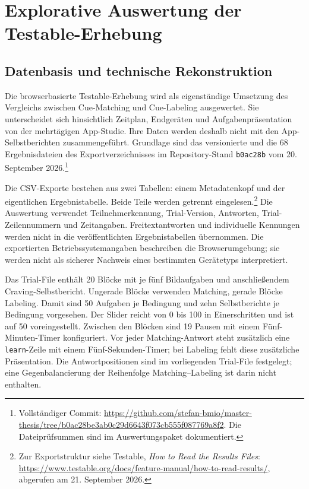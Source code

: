 \section{Explorative Auswertung der Testable-Erhebung}
\label{sec:testable-auswertung}


\subsection{Datenbasis und technische Rekonstruktion}
Die browserbasierte Testable-Erhebung wird als eigenständige Umsetzung des Vergleichs zwischen Cue-Matching und Cue-Labeling ausgewertet. Sie unterscheidet sich hinsichtlich Zeitplan, Endgeräten und Aufgabenpräsentation von der mehrtägigen App-Studie. Ihre Daten werden deshalb nicht mit den App-Selbstberichten zusammengeführt. Grundlage sind das versionierte  und die 68 Ergebnisdateien des Exportverzeichnisses  im Repository-Stand \texttt{b0ac28b} vom 20. September 2026.\footnote{Vollständiger Commit: \url{https://github.com/stefan-bmio/master-thesis/tree/b0ac28be3ab0c29d6643f073cb555f087769a8f2}. Die Dateiprüfsummen sind im Auswertungspaket dokumentiert.}

Die CSV-Exporte bestehen aus zwei Tabellen: einem Metadatenkopf und der eigentlichen Ergebnistabelle. Beide Teile werden getrennt eingelesen.\footnote{Zur Exportstruktur siehe Testable, \emph{How to Read the Results Files}: \url{https://www.testable.org/docs/feature-manual/how-to-read-results/}, abgerufen am 21. September 2026.} Die Auswertung verwendet Teilnehmerkennung, Trial-Version, Antworten, Trial-Zeilennummern und Zeitangaben. Freitextantworten und individuelle Kennungen werden nicht in die veröffentlichten Ergebnistabellen übernommen. Die exportierten Betriebssystemangaben beschreiben die Browserumgebung; sie werden nicht als sicherer Nachweis eines bestimmten Gerätetyps interpretiert.

Das Trial-File enthält 20 Blöcke mit je fünf Bildaufgaben und anschließendem Craving-Selbstbericht. Ungerade Blöcke verwenden Matching, gerade Blöcke Labeling. Damit sind 50 Aufgaben je Bedingung und zehn Selbstberichte je Bedingung vorgesehen. Der Slider reicht von 0 bis 100 in Einerschritten und ist auf 50 voreingestellt. Zwischen den Blöcken sind 19 Pausen mit einem Fünf-Minuten-Timer konfiguriert. Vor jeder Matching-Antwort steht zusätzlich eine \texttt{learn}-Zeile mit einem Fünf-Sekunden-Timer; bei Labeling fehlt diese zusätzliche Präsentation. Die Antwortpositionen sind im vorliegenden Trial-File festgelegt; eine Gegenbalancierung der Reihenfolge Matching--Labeling ist darin nicht enthalten.

